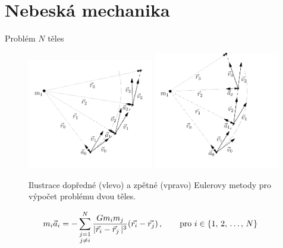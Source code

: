 \documentclass[xcolor=dvipsnames]{beamer}
\newcommand{\abs}[1]{\lvert #1 \,\rvert} %
\begin{document}
\section{Nebeská mechanika}
\begin{frame}{\secname}{Problém $N$ těles}
\begin{figure}
\includegraphics[width=0.49\textwidth]{../asy/asteroidy-3.pdf}
\includegraphics[width=0.49\textwidth]{../asy/asteroidy-4.pdf}
\vspace{-1cm}
\caption{\footnotesize{Ilustrace dopředné (vlevo) a zpětné (vpravo) Eulerovy metody pro výpočet problému dvou těles.}}
\end{figure}
\vspace{-0.5cm}
\begin{align*}
m_i\vec{a}_i &= -\sum_{\substack{j=1 \\ j\neq i}}^N \frac{Gm_im_j}{\abs{\vec{r}_i-\vec{r}_j}^3}(\vec{r_i}-\vec{r_j})\,, \qquad{\rm pro}\ i\in\{1,\,2,\,\dots,\,N\} \label{eq:nbody2}
\end{align*}
\end{frame}
\end{document}
